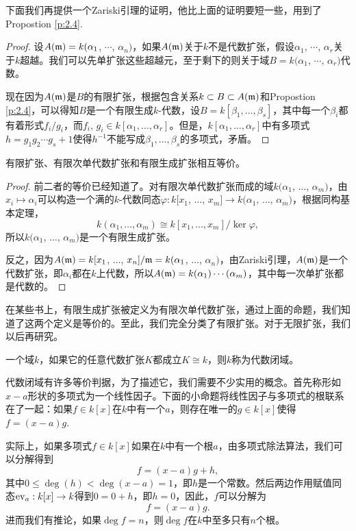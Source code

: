 下面我们再提供一个Zariski引理的证明，他比上面的证明要短一些，用到了Propostion \ref{p:2.4}.

\begin{proof} 设$A(\mathfrak{m})=k(\alpha_1$, $\cdots$, $\alpha_n)$，如果$A(\mathfrak{m})$关于$k$不是代数扩张，假设$\alpha_1$, $\cdots$, $\alpha_r$关于$k$超越。我们可以先单扩张这些超越元，至于剩下的则关于域$B=k(\alpha_1$, $\cdots$, $\alpha_r)$代数。

现在因为$A(\mathfrak{m})$是$B$的有限扩张，根据包含关系$k\subset B\subset A(\mathfrak{m})$和Propostion \ref{p:2.4}，可以得知$B$是一个有限生成$k$-代数，设$B=k[\beta_1,\dots,\beta_s]$，其中每一个$\beta_i$都有着形式$f_i/g_i$，而$f_i$, $g_i\in k[\alpha_1,\dots,\alpha_r]$。但是，$k[\alpha_1,\dots,\alpha_r]$中有多项式$h=g_1g_2\cdots g_{s}+1$使得$h^{-1}$不能写成$\beta_1,\dots,\beta_s$的多项式，矛盾。\end{proof}

\begin{pro}
有限扩张、有限次单代数扩张和有限生成扩张相互等价。
\end{pro}

\begin{proof} 前二者的等价已经知道了。对有限次单代数扩张而成的域$k(\alpha_1$, $\dots$, $\alpha_m)$，由$x_i\mapsto \alpha_i$可以构造一个满的$k$-代数同态$\varphi:k[x_1$, $\dots$, $x_m]\to k(\alpha_1$, $\dots$, $\alpha_m)$，根据同构基本定理，
\[
	k(\alpha_1,\dots,\alpha_m)\cong k[x_1,\dots,x_m]/\ker \varphi,
\]
所以$k(\alpha_1$, $\dots$, $\alpha_m)$是一个有限生成扩张。

反之，因为$A(\mathfrak{m})=k[x_1$, $\dots$, $x_n]/\mathfrak{m}=k(\alpha_1$, $\dots$, $\alpha_n)$，由Zariski引理，$A(\mathfrak{m})$是一个代数扩张，即$\alpha_i$都在$k$上代数，所以$A(\mathfrak{m})=k(\alpha_1)\cdots(\alpha_m)$，其中每一次单扩张都是代数的。\end{proof}

在某些书上，有限生成扩张被定义为有限次单代数扩张，通过上面的命题，我们知道了这两个定义是等价的。至此，我们完全分类了有限扩张。对于无限扩张，我们以后再研究。

\begin{para}[代数闭域]
一个域$k$，如果它的任意代数扩张$K$都成立$K\cong k$，则$k$称为代数闭域。
\end{para}

代数闭域有许多等价判据，为了描述它，我们需要不少实用的概念。首先称形如$x-a$形状的多项式为一个线性因子。下面的小命题将线性因子与多项式的根联系在了一起：如果$f\in k[x]$在$k$中有一个$a$，则存在唯一的$g\in k[x]$使得$f=(x-a)g$.

实际上，如果多项式$f\in k[x]$如果在$k$中有一个根$a$，由多项式除法算法，我们可以分解得到
\[
	f=(x-a)g+h,
\]
其中$0\leq \deg(h)<\deg(x-a)=1$，即$h$是一个常数。然后两边作用赋值同态$\operatorname{ev}_a:k[x]\to k$得到$0=0+h$，即$h=0$，因此，$f$可以分解为
\[
	f=(x-a)g.
\]
进而我们有推论，如果$\deg f=n$，则$\deg f$在$k$中至多只有$n$个根。

